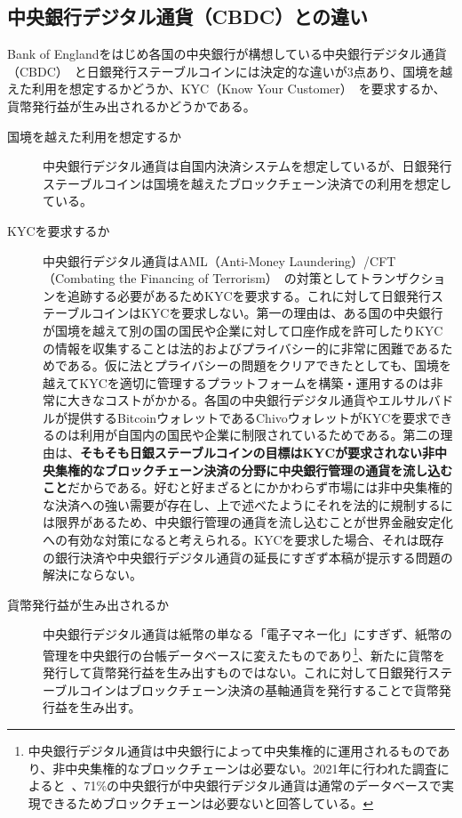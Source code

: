 \documentclass[dvipdfmx,a4paper]{jsarticle}
\begin{document}
\subsection{中央銀行デジタル通貨（CBDC）との違い}

Bank of Englandをはじめ各国の中央銀行が構想している中央銀行デジタル通貨（CBDC）~\cite{cbdc1,cbdc2}と日銀発行ステーブルコインには決定的な違いが3点あり、国境を越えた利用を想定するかどうか、KYC（Know Your Customer）~\cite{parra2017kyc}を要求するか、貨幣発行益が生み出されるかどうかである。

\begin{description}
\item[国境を越えた利用を想定するか] 中央銀行デジタル通貨は自国内決済システムを想定しているが、日銀発行ステーブルコインは国境を越えたブロックチェーン決済での利用を想定している。
\item[KYCを要求するか] 中央銀行デジタル通貨はAML（Anti-Money Laundering）/CFT（Combating the Financing of Terrorism）~\cite{verdugo2011compliance}の対策としてトランザクションを追跡する必要があるためKYCを要求する。これに対して日銀発行ステーブルコインはKYCを要求しない。第一の理由は、ある国の中央銀行が国境を越えて別の国の国民や企業に対して口座作成を許可したりKYCの情報を収集することは法的およびプライバシー的に非常に困難であるためである。仮に法とプライバシーの問題をクリアできたとしても、国境を越えてKYCを適切に管理するプラットフォームを構築・運用するのは非常に大きなコストがかかる。各国の中央銀行デジタル通貨やエルサルバドルが提供するBitcoinウォレットであるChivoウォレットがKYCを要求できるのは利用が自国内の国民や企業に制限されているためである。第二の理由は、\textbf{そもそも日銀ステーブルコインの目標はKYCが要求されない非中央集権的なブロックチェーン決済の分野に中央銀行管理の通貨を流し込むこと}だからである。好むと好まざるとにかかわらず市場には非中央集権的な決済への強い需要が存在し、上で述べたようにそれを法的に規制するには限界があるため、中央銀行管理の通貨を流し込むことが世界金融安定化への有効な対策になると考えられる。KYCを要求した場合、それは既存の銀行決済や中央銀行デジタル通貨の延長にすぎず本稿が提示する問題の解決にならない。
\item[貨幣発行益が生み出されるか] 中央銀行デジタル通貨は紙幣の単なる「電子マネー化」にすぎず、紙幣の管理を中央銀行の台帳データベースに変えたものであり\footnote{中央銀行デジタル通貨は中央銀行によって中央集権的に運用されるものであり、非中央集権的なブロックチェーンは必要ない。2021年に行われた調査によると~\cite{ubssurvey}、71\%の中央銀行が中央銀行デジタル通貨は通常のデータベースで実現できるためブロックチェーンは必要ないと回答している。}、新たに貨幣を発行して貨幣発行益を生み出すものではない。これに対して日銀発行ステーブルコインはブロックチェーン決済の基軸通貨を発行することで貨幣発行益を生み出す。
\end{description}
\end{document}
